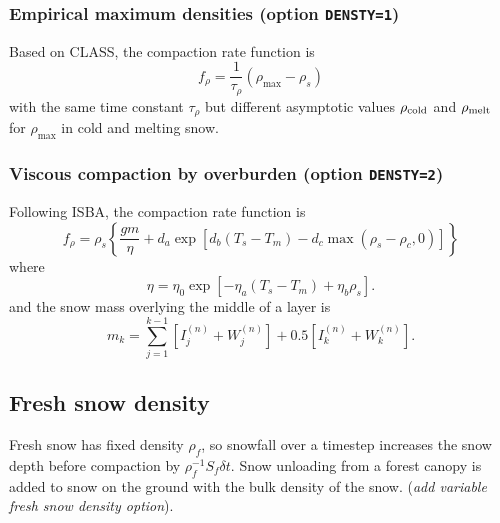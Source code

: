 \documentclass{article}
\begin{document}
\subsubsection{Empirical maximum densities (option {\tt DENSTY=1})}

Based on CLASS, the compaction rate function is
\begin{equation}
f_\rho = \frac{1}{\tau_\rho}(\rho_{\max} - \rho_s)
\end{equation}
with the same time constant $\tau_\rho$ but different asymptotic values $\rho_{\rm cold}$ and $\rho_{\rm melt}$ for $\rho_{\max}$ in cold and melting snow.

\subsubsection{Viscous compaction by overburden (option {\tt DENSTY=2})}

Following ISBA, the compaction rate function is
\begin{equation}
f_\rho = \rho_s\left\{\frac{gm}{\eta}
                    + d_a \exp[d_b (T_s - T_m) - d_c \max(\rho_s - \rho_c, 0)]\right\}
\end{equation}
where
\begin{equation}
\eta = \eta_0\exp\left[-\eta_a(T_s - T_m) + \eta_b \rho_s\right].
\end{equation}
and the snow mass overlying the middle of a layer is
\begin{equation}
m_k = \sum_{j=1}^{k-1}\left[I_j^{(n)} + W_j^{(n)}\right] + 0.5\left[I_k^{(n)} + W_k^{(n)}\right].
\end{equation}

\subsection{Fresh snow density}

Fresh snow has fixed density $\rho_f$, so snowfall over a timestep increases the snow depth before compaction by $\rho_f^{-1}S_f\delta t$. Snow unloading from a forest canopy is added to snow on the ground with the bulk density of the snow.
({\it add variable fresh snow density option}).

\end{document}
